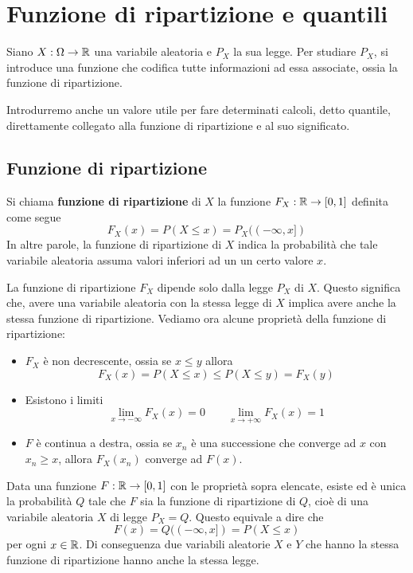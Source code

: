 \section{Funzione di ripartizione e quantili}
Siano $X : \Omega \to \mathbb{R}$ una variabile aleatoria e $P_X$ la sua legge. Per studiare $P_X$, si
introduce una funzione che codifica tutte informazioni ad essa associate, ossia la funzione di
ripartizione.

Introdurremo anche un valore utile per fare determinati calcoli, detto quantile, direttamente
collegato alla funzione di ripartizione e al suo significato.

\subsection{Funzione di ripartizione}
\begin{definition}
	Si chiama \textbf{funzione di ripartizione} di $X$ la funzione $F_X : \mathbb{R} \to [0,1]$ definita
	come segue
	\[ F_X(x) = P (X \leq x) = P_X ((-\infty, x]) \]
	In altre parole, la funzione di ripartizione di $X$ indica la probabilità che tale variabile
	aleatoria assuma valori inferiori ad un un certo valore $x$.
\end{definition}

La funzione di ripartizione $F_X$ dipende solo dalla legge $P_X$ di $X$. Questo significa che,
avere una variabile aleatoria con la stessa legge di $X$ implica avere anche la stessa funzione
di ripartizione. Vediamo ora alcune proprietà della funzione di ripartizione:
\begin{itemize}
	\item $F_X$ è non decrescente, ossia se $x \leq y$ allora
	      \[ F_X(x) = P(X \leq x) \leq P(X \leq y) = F_X(y) \]
	\item Esistono i limiti
	      \[ \lim_{x \to -\infty} F_X(x) = 0 \quad \quad \lim_{x \to +\infty} F_X(x) = 1 \]
	\item $F$ è continua a destra, ossia se $x_n$ è una successione che converge ad $x$ con
	      $x_n \geq x$, allora $F_X(x_n)$ converge ad $F(x)$.
\end{itemize}

\begin{proposition}
	Data una funzione $F : \mathbb{R} \to [0,1]$ con le proprietà sopra elencate, esiste ed è unica la
	probabilità $Q$ tale che $F$ sia la funzione di ripartizione di $Q$, cioè di una variabile
	aleatoria $X$ di legge $P_X = Q$. Questo equivale a dire che
	\[ F(x) = Q((-\infty, x]) = P(X \leq x) \]
	per ogni $x \in \mathbb{R}$. Di conseguenza due variabili aleatorie $X$ e $Y$ che hanno la stessa
	funzione di ripartizione hanno anche la stessa legge.
\end{proposition}


